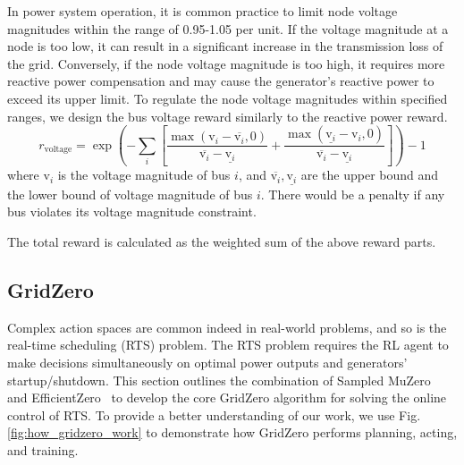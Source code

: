  In power system operation, it is common practice to limit node voltage magnitudes within the range of 0.95-1.05 per unit. If the voltage magnitude at a node is too low, it can result in a significant increase in the transmission loss of the grid. Conversely, if the node voltage magnitude is too high, it requires more reactive power compensation and may cause the generator's reactive power to exceed its upper limit.
To regulate the node voltage magnitudes within specified ranges, we design the bus voltage reward similarly to the reactive power reward.
\begin{equation}
    r_{\text{voltage}}=\exp\left(-\sum_i\left[\frac{\max(\text{v}_i-\overline{\text{v}_i},0)}{\overline{\text{v}_i}-\underline{\text{v}_i}}+\frac{\max(\underline{\text{v}_i}-\text{v}_i,0)}{\overline{\text{v}_i}-\underline{\text{v}_i}}\right]\right)-1
\end{equation}
where $\text{v}_i$ is the voltage magnitude of bus $i$, and $\overline{\text{v}_i}, \underline{\text{v}_i}$ are the upper bound and the lower bound of voltage magnitude of bus $i$. There would be a penalty if any bus violates its voltage magnitude constraint. 

The total reward is calculated as the weighted sum of the above reward parts.

\subsection*{GridZero}
Complex action spaces are common indeed in real-world problems, and so is the real-time scheduling (RTS) problem. The RTS problem requires the RL agent to make decisions simultaneously on optimal power outputs and generators' startup/shutdown. 
This section outlines the combination of Sampled MuZero~\cite{hubert2021learning} and EfficientZero~\cite{ye2021mastering} to develop the core GridZero algorithm for solving the online control of RTS.  
To provide a better understanding of our work, we use Fig.\ref{fig:how_gridzero_work} to demonstrate how GridZero performs planning, acting, and training.

